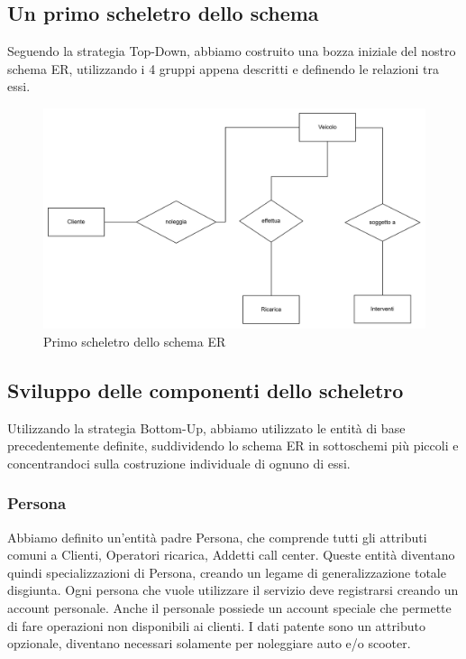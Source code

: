 \documentclass{article}
\begin{document}
\subsection{Un primo scheletro dello schema}

Seguendo la strategia Top-Down, abbiamo costruito una bozza iniziale del nostro schema ER, utilizzando i 4 gruppi appena descritti e definendo le relazioni tra essi.

\begin{figure}[H]
    \centering
    \includegraphics[width=1\linewidth]{top-down.png}
    \caption{Primo scheletro dello schema ER}
    \label{fig:top-down}
\end{figure}


\subsection{Sviluppo delle componenti dello scheletro}

Utilizzando la strategia Bottom-Up, abbiamo utilizzato le entità di base precedentemente definite, suddividendo lo schema ER in sottoschemi più piccoli e concentrandoci sulla costruzione individuale di ognuno di essi.

\subsubsection{Persona}

Abbiamo definito un'entità padre Persona, che comprende tutti gli attributi comuni a Clienti, Operatori ricarica, Addetti call center. Queste entità diventano quindi specializzazioni di Persona, creando un legame di generalizzazione totale disgiunta. Ogni persona che vuole utilizzare il servizio deve registrarsi creando un account personale. Anche il personale possiede un account speciale che permette di fare operazioni non disponibili ai clienti.
I dati patente sono un attributo opzionale, diventano necessari solamente per noleggiare auto e/o scooter.
\end{document}
